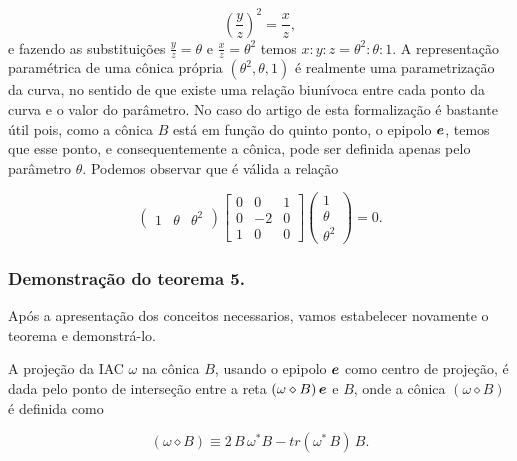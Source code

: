 \begin{equation*}
(\frac{y}{z})^2=\frac{x}{z},
\end{equation*}
e fazendo as substituições $\displaystyle{\frac{y}{z}=\theta}$ e $\displaystyle{\frac{x}{z}=\theta^2}$ temos $x:y:z=\theta^2:\theta:1$.
A representação paramétrica de uma cônica própria $(\theta^2,\theta,1)$ é realmente uma parametrização da curva, no sentido de que existe uma relação biunívoca entre cada ponto da curva e o valor do parâmetro. No caso do artigo de \citep{2503343} esta formalização é bastante útil pois, como a cônica $B$ está em função do quinto ponto, o epipolo $\boldsymbol{e}$, temos que esse ponto, e consequentemente a cônica, pode ser definida apenas pelo parâmetro $\theta$. Podemos observar que é válida a relação

\begin{equation*}
\begin{pmatrix}
1&\theta&\theta^2
\end{pmatrix}
\begin{bmatrix}
0&0&1\\
0&-2&0\\
1&0&0
\end{bmatrix}
\begin{pmatrix}
1\\
\theta\\
\theta^2
\end{pmatrix}
=0.
\end{equation*}


\subsubsection{Demonstração do teorema 5.}

Após a apresentação dos conceitos necessarios, vamos estabelecer novamente o teorema e demonstrá-lo.

\begin{teorema}
A projeção da IAC $\omega$ na cônica $B$, usando o epipolo $\boldsymbol{e}$ como centro de projeção, é dada pelo ponto de interseção entre a reta $(\omega\diamond B)\,\boldsymbol{e}$ e $B$, onde a cônica $(\omega\diamond B)$ é definida como

\begin{equation}\label{eq.conica-diamond}
(\omega \diamond B)\equiv 2\,B\,\omega^*B - tr(\omega^*\,B)\,B.
\end{equation}
\end{teorema}

